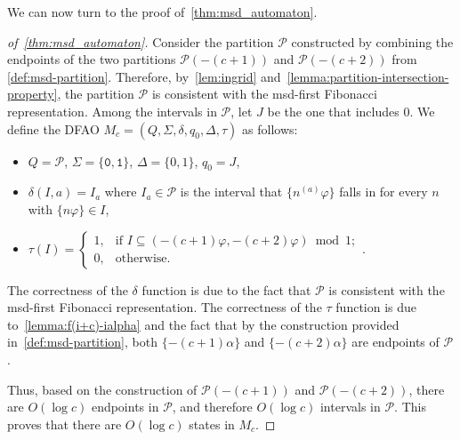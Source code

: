 \documentclass[12pt,runningheads]{llncs}
\newcommand{\tO}{\mathtt{0}}
\newcommand{\tL}{\mathtt{1}}
\newcommand{\cP}{\mathcal{P}}
\renewcommand{\phi}{\varphi}
\newcommand{\ndelta}{n^{(a)}}
\begin{document}
We can now turn to the proof of~\cref{thm:msd_automaton}. 
\begin{proof}[of~\cref{thm:msd_automaton}]
Consider the partition $\cP$ constructed by combining the endpoints of the two partitions $\cP(-(c+1))$ and $\cP(-(c+2))$ from \cref{def:msd-partition}. Therefore, by~\cref{lem:ingrid} and~\cref{lemma:partition-intersection-property}, the partition $\cP$ is consistent with the msd-first Fibonacci representation. Among the intervals in $\cP$, let $J$ be the one that includes $0$. We define the DFAO $M_c=(Q,\Sigma,\delta,q_0,\Delta,\tau)$ as follows: 
\begin{itemize} \setlength{\itemsep}{0em}
    \item $Q = \cP$, \; $\Sigma = \{\tO,\tL\}$, \; $\Delta = \{0,1\}$, \; $q_0=J$,
    \item $\delta(I, a) = I_a$ where $I_a \in \cP$ is the interval that $\{\ndelta \phi\}$ falls in for every $n$ with $\{n\phi\} \in I$, 
    \item $\tau(I) = 
        \begin{cases}
            1, & \text{if $I \subseteq (-(c+1)\phi, -(c+2)\phi)\bmod 1$}; \\
            0, & \text{otherwise.}
        \end{cases}$. 
\end{itemize}
The correctness of the $\delta$ function is due to the fact that $\cP$ is consistent with the msd-first Fibonacci representation. The correctness of the $\tau$ function is due to~\cref{lemma:f(i+c)-ialpha} and the fact that by the construction provided in~\cref{def:msd-partition}, both $\{-(c+1)\alpha\}$ and $\{-(c+2)\alpha\}$ are endpoints of $\cP$.

Thus, based on the construction of $\cP(-(c+1))$ and $\cP(-(c+2))$, there are $O(\log c)$ endpoints in $\cP$, and therefore $O(\log c)$ intervals in $\cP$. This proves that there are $O(\log c)$ states in $M_c$.
\end{proof}
\end{document}
